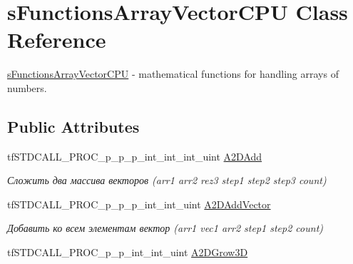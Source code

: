 \hypertarget{structs_functions_array_vector_c_p_u}{\section{s\-Functions\-Array\-Vector\-C\-P\-U Class Reference}
\label{structs_functions_array_vector_c_p_u}
}


\hyperlink{structs_functions_array_vector_c_p_u}{s\-Functions\-Array\-Vector\-C\-P\-U} -\/ mathematical functions for handling arrays of numbers.  


\subsection*{Public Attributes}
\begin{DoxyCompactItemize}
\item 
\hypertarget{structs_functions_array_vector_c_p_u_a4b28984045064701d98ba2bff5cb1e03}{tf\-S\-T\-D\-C\-A\-L\-L\-\_\-\-P\-R\-O\-C\-\_\-p\-\_\-p\-\_\-p\-\_\-int\-\_\-int\-\_\-int\-\_\-uint \hyperlink{structs_functions_array_vector_c_p_u_a4b28984045064701d98ba2bff5cb1e03}{A2\-D\-Add}}\label{structs_functions_array_vector_c_p_u_a4b28984045064701d98ba2bff5cb1e03}

\begin{DoxyCompactList}\small\item\em Сложить два массива векторов (arr1 arr2 rez3 step1 step2 step3 count) \end{DoxyCompactList}\item 
\hypertarget{structs_functions_array_vector_c_p_u_ad03ce8d1a877903b39613324377837ef}{tf\-S\-T\-D\-C\-A\-L\-L\-\_\-\-P\-R\-O\-C\-\_\-p\-\_\-p\-\_\-p\-\_\-int\-\_\-int\-\_\-uint \hyperlink{structs_functions_array_vector_c_p_u_ad03ce8d1a877903b39613324377837ef}{A2\-D\-Add\-Vector}}\label{structs_functions_array_vector_c_p_u_ad03ce8d1a877903b39613324377837ef}

\begin{DoxyCompactList}\small\item\em Добавить ко всем элементам вектор (arr1 vec1 arr2 step1 step2 count) \end{DoxyCompactList}\item 
\hypertarget{structs_functions_array_vector_c_p_u_ae4840c50f1e8aa1d875b3a6d330c0405}{tf\-S\-T\-D\-C\-A\-L\-L\-\_\-\-P\-R\-O\-C\-\_\-p\-\_\-p\-\_\-int\-\_\-int\-\_\-uint \hyperlink{structs_functions_array_vector_c_p_u_ae4840c50f1e8aa1d875b3a6d330c0405}{A2\-D\-Grow3\-D}}\label{structs_functions_array_vector_c_p_u_ae4840c50f1e8aa1d875b3a6d330c0405}


\end{DoxyCompactItemize}
